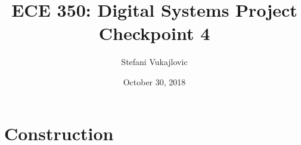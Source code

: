 \usepackage[utf8]{inputenc}
\usepackage{graphicx}
\usepackage{geometry}

\title{ECE 350: Digital Systems Project Checkpoint 4}
\author{Stefani Vukajlovic}
\date{October 30, 2018} %
\maketitle



\maketitle

\section*{Construction}

